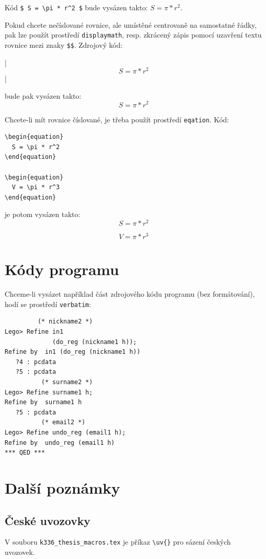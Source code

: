 \documentclass[11pt,twoside,a4paper]{book}
\begin{document}
Kód \verb|$ S = \pi * r^2 $| bude vysázen takto: $ S = \pi * r^2 $.

Pokud chcete nečíslované rovnice, ale umístěné centrovaně na samostatné řádky, pak lze použít prostředí \verb|displaymath|, resp. zkrácený zápis pomocí uzavření textu rovnice mezi znaky \verb|$$|. Zdrojový kód: 
\begin{verb}
|$$ S = \pi * r^2 $$|
\end{verb}
bude pak vysázen takto:
$$ S = \pi * r^2 $$

Chcete-li mít rovnice číslované, je třeba použít prostředí \verb|eqation|. Kód:
\begin{verbatim}
\begin{equation}
  S = \pi * r^2
\end{equation}

\begin{equation}
  V = \pi * r^3
\end{equation}
\end{verbatim}
je potom vysázen takto:
\begin{equation}
  S = \pi * r^2
\end{equation}

\begin{equation}
  V = \pi * r^3
\end{equation}

\section{Kódy programu}
Chceme-li vysázet například část zdrojového kódu programu (bez formátování), hodí se prostředí \verb|verbatim|: 
\begin{verbatim}
         (* nickname2 *)
Lego> Refine in1
             (do_reg (nickname1 h));
Refine by  in1 (do_reg (nickname1 h))
   ?4 : pcdata
   ?5 : pcdata
          (* surname2 *)
Lego> Refine surname1 h;
Refine by  surname1 h
   ?5 : pcdata
          (* email2 *)
Lego> Refine undo_reg (email1 h);
Refine by  undo_reg (email1 h)
*** QED ***
\end{verbatim}

\section{Další poznámky}
\subsection{České uvozovky}
V souboru \verb|k336_thesis_macros.tex| je příkaz \verb|\uv{}| pro sázení českých uvozovek. 
\end{document}
